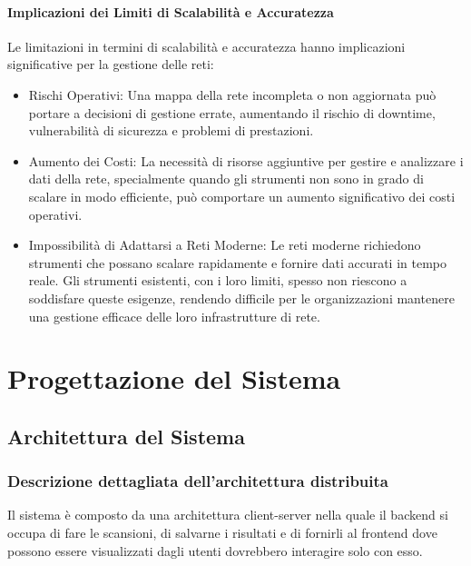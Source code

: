 \documentclass[target=bach,aauheader=,style=]{thud}
\begin{document}
\subsubsection{Implicazioni dei Limiti di Scalabilità e Accuratezza}
Le limitazioni in termini di scalabilità e accuratezza hanno implicazioni significative per la gestione delle reti:
\begin{itemize}
  \item Rischi Operativi: Una mappa della rete incompleta o non aggiornata può portare a decisioni di gestione errate, aumentando il rischio di downtime, vulnerabilità di sicurezza e problemi di prestazioni.
  \item Aumento dei Costi: La necessità di risorse aggiuntive per gestire e analizzare i dati della rete, specialmente quando gli strumenti non sono in grado di scalare in modo efficiente, può comportare un aumento significativo dei costi operativi.
  \item Impossibilità di Adattarsi a Reti Moderne: Le reti moderne richiedono strumenti che possano scalare rapidamente e fornire dati accurati in tempo reale. Gli strumenti esistenti, con i loro limiti, spesso non riescono a soddisfare queste esigenze, rendendo difficile per le organizzazioni mantenere una gestione efficace delle loro infrastrutture di rete.
\end{itemize}



\chapter{Progettazione del Sistema}
\section{Architettura del Sistema}
\subsection{Descrizione dettagliata dell'architettura distribuita}
Il sistema è composto da una architettura client-server nella quale il backend si occupa di fare le scansioni, di salvarne i risultati e di fornirli al frontend dove possono essere visualizzati dagli utenti dovrebbero interagire solo con esso. 
\end{document}
